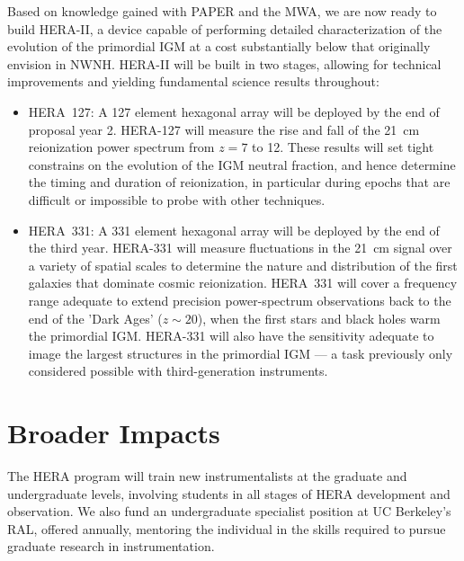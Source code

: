 \documentclass[preprint]{aastex}
\begin{document}
Based on knowledge gained with PAPER and the MWA, we are now ready to build HERA-II, a device
capable of performing detailed characterization of the evolution of the primordial IGM at
a cost substantially below that originally envision in NWNH. HERA-II will be built in two stages, 
allowing for technical improvements and yielding fundamental science results throughout:


\begin{itemize}[noitemsep,nolistsep]

\item HERA~127: A 127 element hexagonal array will be deployed by
the end of proposal year 2. HERA-127 will measure the rise and fall of the
21~cm reionization power spectrum from $z = 7$ to 12. These results will set tight
constrains on the evolution of the IGM neutral fraction, and hence determine
the timing and duration of reionization, in particular during epochs that are difficult or impossible to
probe with other techniques.

\item HERA~331: A 331 element hexagonal array will be deployed by the end of the third year. HERA-331
will measure fluctuations in the 21~cm signal over a variety of spatial
scales to determine the nature and distribution of the first galaxies
that dominate cosmic reionization. HERA~331 will cover a frequency range adequate to extend precision
power-spectrum observations back to the end of the 'Dark Ages' ($z \sim 20$),
when the first stars and black holes warm the primordial IGM. HERA-331 will also have the
sensitivity adequate to image the largest structures in the primordial
IGM --- a task previously only considered possible with third-generation
instruments. 

\end{itemize}

\section*{Broader Impacts}

The HERA program will train new instrumentalists at the graduate and undergraduate levels, involving 
students in all stages of HERA development and observation. We also fund an
undergraduate specialist position at UC Berkeley's RAL, offered annually,
mentoring the individual in the skills required to pursue graduate
research in instrumentation.
\end{document}
